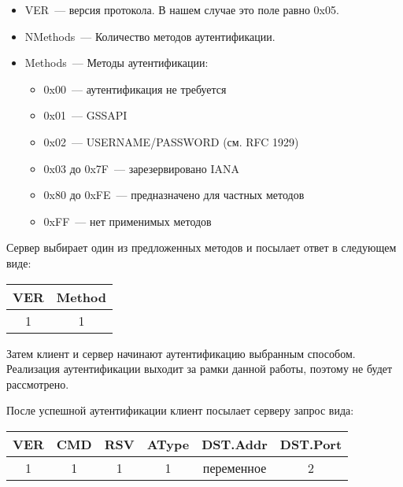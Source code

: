 \documentclass[a4paper,11pt]{article}
\begin{document}
\begin{itemize}
  
  \item VER~--- версия протокола. В нашем случае это поле равно 0x05.
  
  \item NMethods~--- Количество методов аутентификации.
  
  \item Methods~--- Методы аутентификации:
  
  \begin{itemize}
    
    \item 0x00~--- аутентификация не требуется
    
    \item 0x01~--- GSSAPI
    
    \item 0x02~--- USERNAME/PASSWORD (см. RFC 1929)
    
    \item 0x03 до 0x7F~--- зарезервировано IANA
    
    \item 0x80 до 0xFE~--- предназначено для частных методов
    
    \item 0xFF~--- нет применимых методов
    
  \end{itemize}
  
\end{itemize}

Сервер выбирает один из предложенных методов и посылает ответ в следующем виде:

\begin{tabular}{|c|c|}  
  \hline  
  VER & Method \\
  \hline  
  1 & 1 \\  
  \hline
\end{tabular}

Затем клиент и сервер начинают аутентификацию выбранным способом. Реализация аутентификации выходит за рамки данной работы, поэтому не будет рассмотрено. 

После успешной аутентификации клиент посылает серверу запрос вида:

\begin{tabular}{|c|c|c|c|c|c|}  
  \hline  
  VER & CMD & RSV & AType & DST.Addr & DST.Port \\
  \hline  
  1 & 1 & 1 & 1 & переменное & 2\\  
  \hline
\end{tabular}
\end{document}
